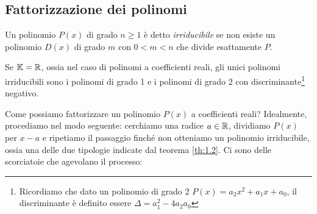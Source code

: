 \subsection{Fattorizzazione dei polinomi}
\begin{definition}
    \label{def:1.7}
    Un polinomio $P(x)$ di grado $n\ge 1$ è detto \emph{irriducibile} se non esiste un polinomio $D(x)$ di grado $m$ con $0<m<n$ che divide esattamente $P$.
\end{definition}
\begin{theorem}
    \label{th:1.2}
    Se $\amsbb{K}=\amsbb{R}$, ossia nel caso di polinomi a coefficienti reali, gli unici polinomi irriducibili sono i polinomi di grado 1 e i polinomi di grado 2 con discriminante\footnote{Ricordiamo che dato un polinomio di grado 2 $P(x) = a_2x^2 + a_1x+a_0$, il discriminante è definito essere $\Delta = a_1^2-4a_2a_0$} negativo.
\end{theorem}
Come possiamo fattorizzare un polinomio $P(x)$ a coefficienti reali? Idealmente, procediamo nel modo seguente: cerchiamo una radice $a\in\amsbb{R}$, dividiamo $P(x)$ per $x-a$ e ripetiamo il passaggio finché non otteniamo un polinomio irriducibile, ossia una delle due tipologie indicate dal teorema \ref{th:1.2}. Ci sono delle scorciatoie che agevolano il processo:
